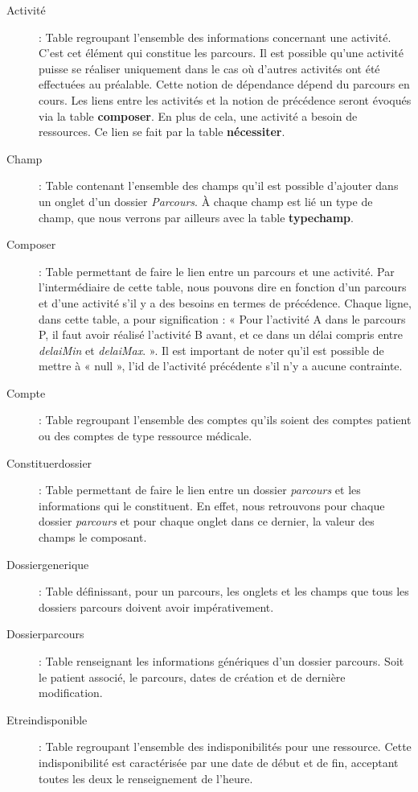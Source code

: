\documentclass[noposter]{polytech/polytech}
\begin{document}
\begin{description}
	\item[Activité] : Table regroupant l'ensemble des informations concernant une activité. C'est cet élément qui constitue les parcours. Il est possible qu'une activité puisse se réaliser uniquement dans le cas où d'autres activités ont été effectuées au préalable. Cette notion de dépendance dépend du parcours en cours. Les liens entre les activités et la notion de précédence seront évoqués via la table \textbf{composer}. En plus de cela, une activité a besoin de ressources. Ce lien se fait par la table \textbf{nécessiter}.
	\item[Champ] : Table contenant l'ensemble des champs qu'il est possible d'ajouter dans un onglet d'un dossier \textit{Parcours}. À chaque champ est lié un type de champ, que nous verrons par ailleurs avec la table \textbf{typechamp}.
	\item[Composer] : Table permettant de faire le lien entre un parcours et une activité. Par l'intermédiaire de cette table, nous pouvons dire en fonction d'un parcours et d'une activité s'il y a des besoins en termes de précédence. Chaque ligne, dans cette table, a pour signification : « Pour l'activité A dans le parcours P, il faut avoir réalisé l'activité B avant, et ce dans un délai compris entre \textit{delaiMin} et \textit{delaiMax}. ». Il est important de noter qu'il est possible de mettre à « null », l'id de l'activité précédente s'il n'y a aucune contrainte.
	\item[Compte] : Table regroupant l'ensemble des comptes qu'ils soient des comptes patient ou des comptes de type ressource médicale.
	\item[Constituerdossier] : Table permettant de faire le lien entre un dossier \textit{parcours} et les informations qui le constituent. En effet, nous retrouvons pour chaque dossier \textit{parcours} et pour chaque onglet dans ce dernier, la valeur des champs le composant.
	\item[Dossiergenerique] : Table définissant, pour un parcours, les onglets et les champs que tous les dossiers parcours doivent avoir impérativement.
	\item[Dossierparcours] : Table renseignant les informations génériques d'un dossier parcours. Soit le patient associé, le parcours, dates de création et de dernière modification.
	\item[Etreindisponible] : Table regroupant l'ensemble des indisponibilités pour une ressource. Cette indisponibilité est caractérisée par une date de début et de fin, acceptant toutes les deux le renseignement de l'heure.

\end{description}
\end{document}
